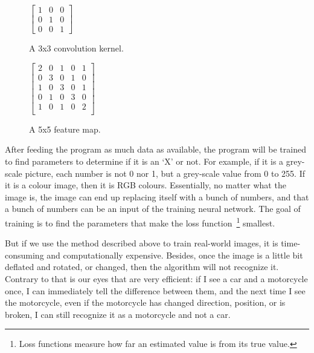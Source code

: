 \begin{figure}[!tbp]
  \centering
  \begin{minipage}[b]{0.4\textwidth}
    \centering
    $\begin{bmatrix}
    1 & 0 & 0\\
    0 & 1 & 0\\
    0 & 0 & 1
    \end{bmatrix}$
    \caption{A 3x3 convolution kernel.}
    \label{fig:3x3_convolution_kernel}
  \end{minipage}
  \hfill
  \begin{minipage}[b]{0.4\textwidth}
    \centering
    $\begin{bmatrix}
    2 & 0 & 1 & 0 & 1\\
    0 & 3 & 0 & 1 & 0\\
    1 & 0 & 3 & 0 & 1\\
    0 & 1 & 0 & 3 & 0\\
    1 & 0 & 1 & 0 & 2\\
    \end{bmatrix}$
    \caption{A 5x5 feature map.}
    \label{fig:5x5_feature_map}
  \end{minipage}
\end{figure}



After feeding the program as much data as available, the program will be trained to find parameters to determine if it is an `X' or not. For example, if it is a grey-scale picture, each number is not 0 nor 1, but a grey-scale value from 0 to 255. If it is a colour image, then it is RGB colours. Essentially, no matter what the image is, the image can end up replacing itself with a bunch of numbers, and that a bunch of numbers can be an input of the training neural network. The goal of training is to find the parameters that make the loss function~\footnote{Loss functions measure how far an estimated value is from its true value.} smallest.

But if we use the method described above to train real-world images, it is time-consuming and computationally expensive. Besides, once the image is a little bit deflated and rotated, or changed, then the algorithm will not recognize it. Contrary to that is our eyes that are very efficient: if I see a car and a motorcycle once, I can immediately tell the difference between them, and the next time I see the motorcycle, even if the motorcycle has changed direction, position, or is broken, I can still recognize it as a motorcycle and not a car.



